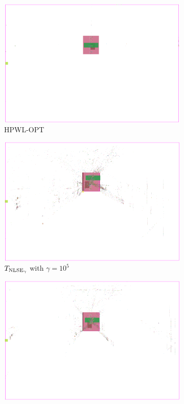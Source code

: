 \begin{figure}
 \begin{subfigure}{.32\textwidth}
  \includegraphics[width=\textwidth]{start_vectors/convergence_Chip1_hpwl.png}  
  \caption{HPWL-OPT}
 \end{subfigure}
 \hfill
 \begin{subfigure}{.32\textwidth}
  \includegraphics[width=\textwidth]{start_vectors/convergence_Chip1_LSE_hpwl_100000_gamma.png}  
  \caption{\(T_{\operatorname{NLSE}_\gamma}\) with \(\gamma = 10^5\)}
 \end{subfigure}
 \hfill
 \begin{subfigure}{.32\textwidth}
  \includegraphics[width=\textwidth]{start_vectors/convergence_Chip1_WA_hpwl_100000_gamma.png}  

\end{subfigure}
\end{figure}
